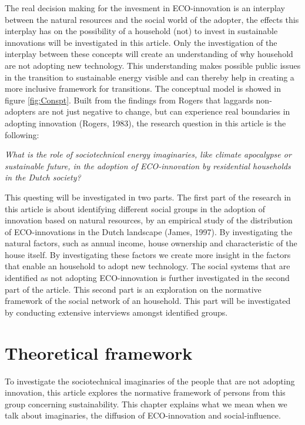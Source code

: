 \documentclass[man,floatsintext]{apa6}
\begin{document}
The real decision making for the invesment in ECO-innovation is an
interplay between the natural resources and the social world of the
adopter, the effects this interplay has on the possibility of a
household (not) to invest in sustainable innovations will be
investigated in this article. Only the investigation of the interplay
between these concepts will create an understanding of why household are
not adopting new technology. This understanding makes possible public
issues in the transition to sustainable energy visible and can thereby
help in creating a more inclusive framework for transitions. The
conceptual model is showed in figure \ref{fig:Conspt}. Built from the
findings from Rogers that laggards non-adopters are not just negative to
change, but can experience real boundaries in adopting innovation
(Rogers, 1983), the research question in this article is the following:

\emph{What is the role of sociotechnical energy imaginaries, like
climate apocalypse or sustainable future, in the adoption of
ECO-innovation by residential households in the Dutch society?}

This questing will be investigated in two parts. The first part of the
research in this article is about identifying different social groups in
the adoption of innovation based on natural resources, by an empirical
study of the distribution of ECO-innovations in the Dutch landscape
(James, 1997). By investigating the natural factors, such as annual
income, house ownership and characteristic of the house itself. By
investigating these factors we create more insight in the factors that
enable an household to adopt new technology. The social systems that are
identified as not adopting ECO-innovation is further investigated in the
second part of the article. This second part is an exploration on the
normative framework of the social network of an household. This part
will be investigated by conducting extensive interviews amongst
identified groups.

\section{Theoretical framework}\label{theoretical-framework}

To investigate the sociotechnical imaginaries of the people that are not
adopting innovation, this article explores the normative framework of
persons from this group concerning sustainability. This chapter explains
what we mean when we talk about imaginaries, the diffusion of
ECO-innovation and social-influence.
\end{document}
